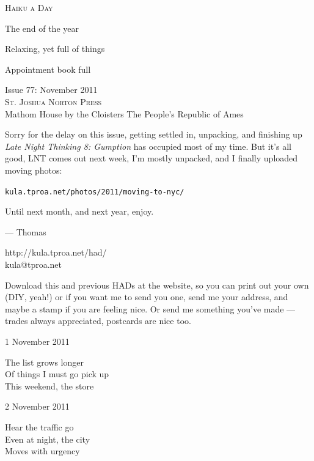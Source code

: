 \documentclass[12pt]{article}
\begin{document}
\begin{center}
{\fontsize{36}{48}\selectfont \textsc{Haiku a Day }}
\end{center}

\vspace*{3.5cm}

{\fontsize{20}{40}\selectfont 

The end of the year

Relaxing, yet full of things

Appointment book full

}

\vspace*{5.0cm}
\begin{center}
{\large{Issue 77: November 2011}} \\[5mm]
{\fontsize{8}{8}\selectfont  \textsc{ St. Joshua Norton Press }} \\[1mm]
{\fontsize{6}{6}\selectfont Mathom House by the Cloisters \textbar The People's Republic of Ames }
\end{center}


\newpage

Sorry for the delay on this issue, getting settled in, unpacking,
and finishing up {\em Late Night Thinking 8: Gumption} has occupied
most of my time. But it's all good, LNT comes out next week, I'm
mostly unpacked, and I finally uploaded moving photos:

{\tt kula.tproa.net/photos/2011/moving-to-nyc/ }

Until next month, and next year, enjoy.


--- Thomas

http://kula.tproa.net/had/ \\
kula@tproa.net

Download this and previous HADs at the website, so you can
print out your own (DIY, yeah!) or if you want me to send
you one, send me your address, and maybe a stamp if you
are feeling nice. Or send me something you've made ---
trades always appreciated, postcards are nice too.

\vfill

1 November 2011

The list grows longer \\
Of things I must go pick up \\
This weekend, the store

2 November 2011

Hear the traffic go \\
Even at night, the city \\
Moves with urgency
\end{document}
